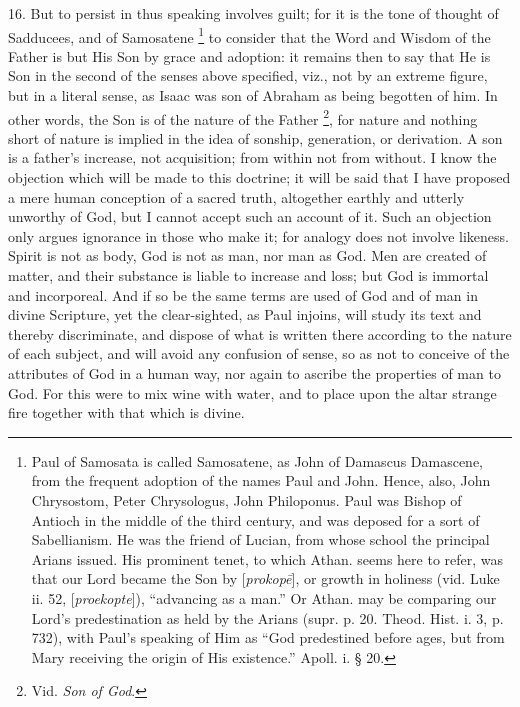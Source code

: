 16. But to persist in thus
speaking involves guilt; for it is the tone of thought of Sadducees,
and of Samosatene \footnote{Paul of Samosata is called Samosatene, as John of Damascus Damascene,
from the frequent adoption of the names Paul and John. Hence, also,
John Chrysostom, Peter Chrysologus, John Philoponus. Paul was Bishop
of Antioch in the middle of the third century, and was deposed for a
sort of Sabellianism. He was the friend of Lucian, from whose school
the principal Arians issued. His prominent tenet, to which Athan.
seems here to refer, was that our Lord became the Son by [\emph{prokop\={e}}],
or growth in holiness (vid. Luke ii. 52, [\emph{proekopte}]), ``advancing
as a man.'' Or Athan. may be comparing our Lord's predestination as
held by the Arians (supr. p. 20. Theod. Hist. i. 3, p. 732), with Paul's
speaking of Him as ``God predestined before ages, but from Mary
receiving the origin of His existence.'' Apoll. i. § 20.} to
consider that the Word and Wisdom of the Father is but His Son by
grace and adoption: it remains then to say that He is Son in the
second of the senses above specified, viz., not by an extreme figure,
but in a literal sense, as Isaac was son of Abraham as being begotten
of him. In other words, the Son is of the nature of the Father \footnote{Vid. \emph{Son of God}.}, for nature and nothing short of nature is implied in the idea
of sonship, generation, or derivation. A son is a father's increase,
not acquisition; from within not from without. I know the objection
which will be made to this doctrine; it will be said that I have
proposed a mere human conception of a sacred truth, altogether
earthly and utterly unworthy of God, but I cannot accept such an
account of it. Such an objection only argues ignorance in those who
make it; for analogy does not involve likeness. Spirit is not as body,
God is not as man, nor man as God. Men are created of matter, and
their substance is liable to increase and loss; but God is immortal
and incorporeal. And if so be the same terms are used of God and of
man in divine Scripture, yet the clear-sighted, as Paul injoins, will
study its text and thereby discriminate, and dispose of what is
written there according to the nature of each subject, and will avoid
any confusion of sense, so as not to conceive of the attributes of God
in a human way, nor again to ascribe the properties of man to God. For
this were to mix wine with water, and to place upon the altar strange
fire together with that which is divine.

